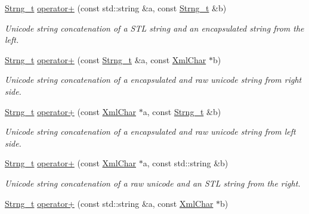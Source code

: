 \begin{DoxyCompactItemize}
\hyperlink{class_d_d4hep_1_1_x_m_l_1_1_strng__t}{Strng\_\-t} \hyperlink{group___d_d4_h_e_p___x_m_l_gab7183a795b02243de6de9f3cd3665cb0}{operator+} (const std::string \&a, const \hyperlink{class_d_d4hep_1_1_x_m_l_1_1_strng__t}{Strng\_\-t} \&b)
\begin{DoxyCompactList}\small\item\em Unicode string concatenation of a STL string and an encapsulated string from the left. \item\end{DoxyCompactList}\item 
\hyperlink{class_d_d4hep_1_1_x_m_l_1_1_strng__t}{Strng\_\-t} \hyperlink{group___d_d4_h_e_p___x_m_l_ga80dcfab5263e77bc2580f30c7d0e4f2e}{operator+} (const \hyperlink{class_d_d4hep_1_1_x_m_l_1_1_strng__t}{Strng\_\-t} \&a, const \hyperlink{namespace_d_d4hep_1_1_x_m_l_a09e5d9cc86ed782f6826dfe0778c1815}{XmlChar} $\ast$b)
\begin{DoxyCompactList}\small\item\em Unicode string concatenation of a encapsulated and raw unicode string from right side. \item\end{DoxyCompactList}\item 
\hyperlink{class_d_d4hep_1_1_x_m_l_1_1_strng__t}{Strng\_\-t} \hyperlink{group___d_d4_h_e_p___x_m_l_gafe9f9443003bbab38d67856960e62071}{operator+} (const \hyperlink{namespace_d_d4hep_1_1_x_m_l_a09e5d9cc86ed782f6826dfe0778c1815}{XmlChar} $\ast$a, const \hyperlink{class_d_d4hep_1_1_x_m_l_1_1_strng__t}{Strng\_\-t} \&b)
\begin{DoxyCompactList}\small\item\em Unicode string concatenation of a encapsulated and raw unicode string from left side. \item\end{DoxyCompactList}\item 
\hyperlink{class_d_d4hep_1_1_x_m_l_1_1_strng__t}{Strng\_\-t} \hyperlink{group___d_d4_h_e_p___x_m_l_ga818876f0e3a3be20c11eeb6ea2871bdc}{operator+} (const \hyperlink{namespace_d_d4hep_1_1_x_m_l_a09e5d9cc86ed782f6826dfe0778c1815}{XmlChar} $\ast$a, const std::string \&b)
\begin{DoxyCompactList}\small\item\em Unicode string concatenation of a raw unicode and an STL string from the right. \item\end{DoxyCompactList}\item 
\hyperlink{class_d_d4hep_1_1_x_m_l_1_1_strng__t}{Strng\_\-t} \hyperlink{group___d_d4_h_e_p___x_m_l_ga2158e654f7603cf773042a5cb231f398}{operator+} (const std::string \&a, const \hyperlink{namespace_d_d4hep_1_1_x_m_l_a09e5d9cc86ed782f6826dfe0778c1815}{XmlChar} $\ast$b)

\end{DoxyCompactItemize}
